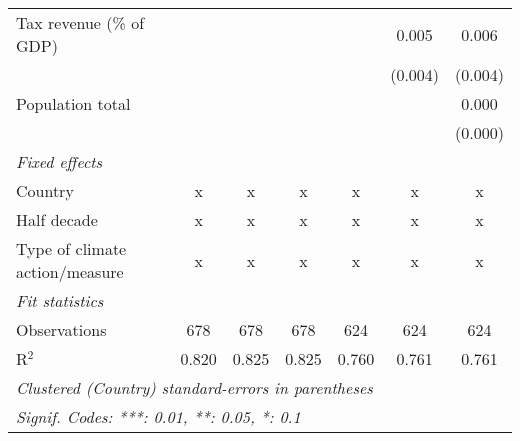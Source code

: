 \begin{tabular}{lcccccc}
   Tax revenue (\% of GDP)                                        &               &                &                &                & 0.005         & 0.006\\   
                                                                  &               &                &                &                & (0.004)       & (0.004)\\   
   Population total                                               &               &                &                &                &               & 0.000\\   
                                                                  &               &                &                &                &               & (0.000)\\   
   \emph{Fixed effects}\\
   Country                                                        & x             & x              & x              & x              & x             & x\\  
   Half decade                                                    & x             & x              & x              & x              & x             & x\\  
   Type of climate action/measure                                 & x             & x              & x              & x              & x             & x\\  
   \midrule \emph{Fit statistics}\\
   Observations                                                   & 678           & 678            & 678            & 624            & 624           & 624\\  
   R$^2$                                                          & 0.820         & 0.825          & 0.825          & 0.760          & 0.761         & 0.761\\  
   \midrule
   \multicolumn{7}{l}{\emph{Clustered (Country) standard-errors in parentheses}}\\
   \multicolumn{7}{l}{\emph{Signif. Codes: ***: 0.01, **: 0.05, *: 0.1}}\\
\end{tabular}
\par\endgroup


